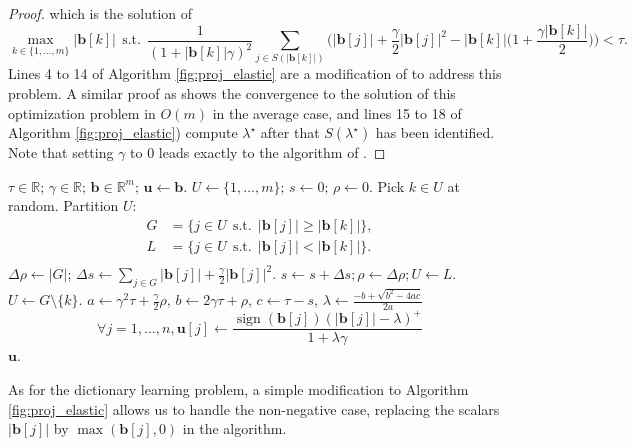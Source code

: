 \documentclass[twoside,11pt]{article}
\def\O{{O}}
\def\b{{\mathbf b}}
\def\u{{\mathbf u}}
\def\Real{{\mathbb R}}
\def\u{{\mathbf u}}
\def\sign{\operatorname{sign}}
\def\st{~~\text{s.t.}~~}
\begin{document}
\begin{proof}
   which is the solution of
   \begin{displaymath}
      \max_{k \in \{1,\ldots,m\}} |\b[k]| \st \frac{1}{(1+|\b[k]|\gamma)^2} \sum_{ j \in S(|\b[k]|)}\Big( |\b[j]| +
      \frac{\gamma}{2}|\b[j]|^2 -
      |\b[k]|\big(1+\frac{\gamma|\b[k]|}{2}\big)\Big) < \tau.
   \end{displaymath}
   Lines 4 to 14 of Algorithm \ref{fig:proj_elastic} are a modification of \citet{duchi} to 
   address this problem. A similar proof as \citet{duchi} shows the convergence to the solution
   of this optimization problem in $\O(m)$ in the average case,
   and lines 15 to 18 of Algorithm \ref{fig:proj_elastic}) compute $\lambda^\star$ after that $S(\lambda^\star)$ 
   has been identified.
   Note that setting $\gamma$ to $0$ leads exactly to the algorithm of \citet{duchi}.
\end{proof}

\begin{algorithm}
   \caption{Efficient projection on the elastic-net constraint.}
   \label{fig:proj_elastic}
   \begin{algorithmic}[1]
      \REQUIRE $\tau \in \Real$; $\gamma \in \Real$; $\b \in \Real^m$;
      \IF{$||\b||_1 + \frac{\gamma}{2}||\b||_2^2 \leq \tau$}
         \RETURN $\u \leftarrow \b$.
      \ELSE
      \STATE $U \leftarrow \{1,\ldots,m\}$; $s \leftarrow 0$; $\rho \leftarrow 0$.
      \STATE Pick $k \in U$ at random.
      \STATE Partition $U$:
      \begin{displaymath}
         \begin{split}
            G &= \{ j \in U \st |\b[j]| \geq |\b[k]| \}, \\
            L &= \{ j \in U \st |\b[j]| < |\b[k]| \}. \\
         \end{split}
      \end{displaymath}
      \STATE $\Delta\rho \leftarrow |G|$; $\Delta s \leftarrow \sum_{j \in G} |\b[j]|+\frac{\gamma}{2}|\b[j]|^2$.
      \IF{ $s + \Delta s - (\rho + \Delta \rho)(1+ \frac{\gamma}{2}|\b[k]|)|\b[k]|  < \tau (1+\gamma |\b[k]|)^2$}
      \STATE $s \leftarrow s + \Delta s; \rho \leftarrow \Delta \rho; U \leftarrow L$.
      \ELSE
      \STATE $U \leftarrow G \setminus \{k \}$.
      \ENDIF
      \ENDWHILE
      \STATE $a \leftarrow \gamma^2\tau+\frac{\gamma}{2}\rho$,
      \STATE $b \leftarrow 2\gamma\tau+\rho$,
      \STATE $c \leftarrow \tau-s$,
      \STATE $\lambda \leftarrow \frac{-b+\sqrt{b^2-4 a c}}{2a}$
      \STATE $$\forall j=1,\ldots,n, \u[j] \leftarrow \frac{\sign(\b[j])(|\b[j]|-\lambda)^+}{1+\lambda\gamma}$$
      \RETURN $\u$.
      \ENDIF
   \end{algorithmic}
\end{algorithm}
As for the dictionary learning problem, a simple modification to
Algorithm \ref{fig:proj_elastic} allows us to handle the non-negative
case, replacing the scalars $|\b[j]|$ by $\max(\b[j],0)$ in the algorithm.
\end{document}
